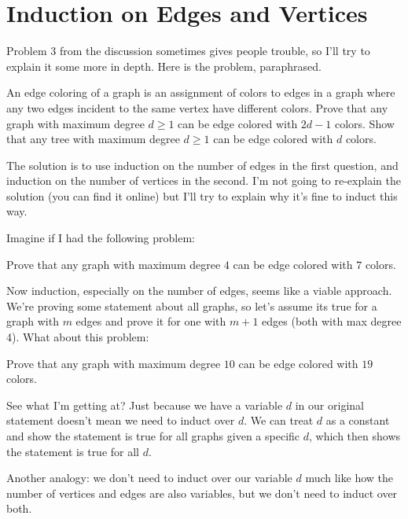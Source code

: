 \documentclass[11 pt]{scrartcl}
\begin{document}
\section{Induction on Edges and Vertices}
Problem 3 from the discussion sometimes gives people trouble, so I'll try to explain it some more in depth. Here is the problem, paraphrased. 

\begin{problem}
An edge coloring of a graph is an assignment of colors to edges in a graph where any two edges incident to the same vertex have different colors.
\alphanum
    \ii Prove that any graph with maximum degree $d\geq 1$ can be edge colored with $2d-1$ colors.
    \ii Show that any tree with maximum degree $d\geq 1$ can be edge colored with $d$ colors.
\enumend
\end{problem}

The solution is to use induction on the number of edges in the first question, and induction on the number of vertices in the second. I'm not going to re-explain the solution (you can find it online) but I'll try to explain why it's fine to induct this way.

Imagine if I had the following problem: 
\begin{question}
    Prove that any graph with maximum degree $4$ can be edge colored with $7$ colors. 
\end{question}

Now induction, especially on the number of edges, seems like a viable approach. We're proving some statement about all graphs, so let's assume its true for a graph with $m$ edges and prove it for one with $m+1$ edges (both with max degree 4). What about this problem:

\begin{question}
    Prove that any graph with maximum degree $10$ can be edge colored with $19$ colors. 
\end{question}

See what I'm getting at? Just because we have a variable $d$ in our original statement doesn't mean we need to induct over $d$. We can treat $d$ as a constant and show the statement is true for all graphs given a specific $d$, which then shows the statement is true for all $d$. 

Another analogy: we don't need to induct over our variable $d$ much like how the number of vertices and edges are also variables, but we don't need to induct over both. 

\fi
\end{document}
